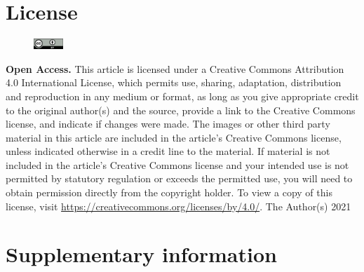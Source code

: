 \documentclass[twocolumn, empirical, authordate, issue]{jote-new-article}
\begin{document}
    \section{License}
        \begin{figure}%
        \vspace{-12pt}
        \includegraphics[width=0.1\textwidth]{media/by}%
        \end{figure}
        \textbf{\textsf{Open Access.}} This article is licensed under a Creative Commons Attribution 4.0 International License, which permits use, sharing, adaptation, distribution and reproduction in any medium or format, as long as you give appropriate credit to the original author(s) and the source, provide a link to the Creative Commons license, and indicate if changes were made. The images or other third party material in this article are included in the article’s Creative Commons license, unless indicated otherwise in a credit line to the material. If material is not included in the article’s Creative Commons license and your intended use is not permitted by statutory regulation or exceeds the permitted use, you will need to obtain permission directly from the copyright holder. To view a copy of this license, visit \href{https://creativecommons.org/licenses/by/4.0/}{https://creativecommons.org/licenses/by/4.0/}.
        \newline\newline
        \textcopyright \text{ }The Author(s) 2021

\onecolumn

\section{Supplementary information} 
\end{document}
